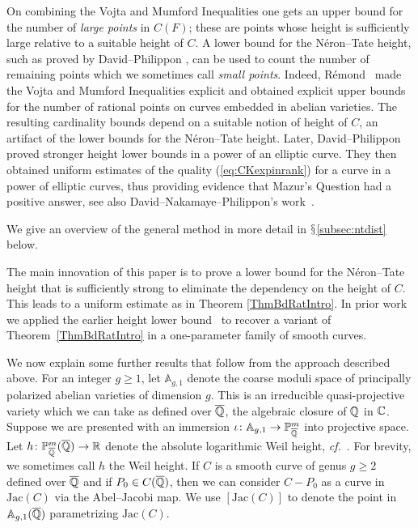 On combining the Vojta and Mumford Inequalities
one gets an upper bound for the number of \textit{large points} in
$C(F)$; these are points whose height is sufficiently large relative
to a suitable height of $C$. A lower bound for the N\'eron--Tate
height, such as proved by David--Philippon \cite{DPvarabII}, can be used to
count the number of remaining points which we sometimes call
\textit{small points}. 
Indeed, R\'emond~\cite{Remond:Decompte} made the Vojta and Mumford
Inequalities explicit and obtained 
explicit upper bounds for the number of rational points on curves
embedded in abelian varieties. 
The resulting cardinality bounds
depend on a suitable notion of height of $C$, an artifact of the lower
bounds for the N\'eron--Tate height. 
Later, David--Philippon~\cite{DaPh:07} proved stronger height lower
bounds
in a power of an
elliptic curve. They then 
 obtained uniform estimates
of the quality (\ref{eq:CKexpinrank}) for a curve in a power of
elliptic curves,  thus providing evidence that Mazur's Question had a
positive answer, see also
David--Nakamaye--Philippon's work~\cite{DaNaPh:07}.

We give an overview of the general method  in more detail in
$\mathsection$\ref{subsec:ntdist} below. 

The main innovation of this paper is to prove a lower bound for the
N\'eron--Tate height that is sufficiently strong to eliminate the
dependency on the height of $C$. This leads to a uniform estimate as
in Theorem \ref{ThmBdRatIntro}. In prior work~\cite{DGH1p} we
applied the earlier height lower bound~\cite{GaoHab}
to recover a variant of Theorem~\ref{ThmBdRatIntro} in
a one-parameter family of smooth curves.

We now explain some further  results that follow from the approach
described above. 
For an integer $g\ge 1$, let $\mathbb{A}_{g,1}$ denote the coarse moduli
space of principally polarized abelian varieties of dimension $g$.
This is an irreducible quasi-projective variety which we can take as
defined over ${\overline{\mathbb{Q}}}$, the algebraic closure of ${\mathbb{Q}}$ in ${\mathbb{C}}$.
Suppose we are presented with an immersion
$\iota\colon \mathbb{A}_{g,1}\rightarrow {\mathbb{P}}^m_{\overline{\mathbb{Q}}}$ into projective
space.
Let $h\colon {\mathbb{P}}^m_{\overline{\mathbb{Q}}}({\overline{\mathbb{Q}}})\rightarrow{\mathbb{R}}$ denote the absolute
logarithmic Weil height,
\textit{cf.}~\cite[$\mathsection$1.5.1]{BG}.
For brevity, we sometimes call $h$ the Weil height.
If $C$ is a smooth curve of genus $g\ge 2$ defined over ${\overline{\mathbb{Q}}}$ and if
$P_0\in C({\overline{\mathbb{Q}}})$, then we can consider $C-P_0$ as a curve in
$\mathrm{Jac}(C)$ via the Abel--Jacobi map.
We use $[\mathrm{Jac}(C)]$ to denote the point in $ \mathbb{A}_{g,1}({\overline{\mathbb{Q}}})$  parametrizing $\mathrm{Jac}(C)$.

